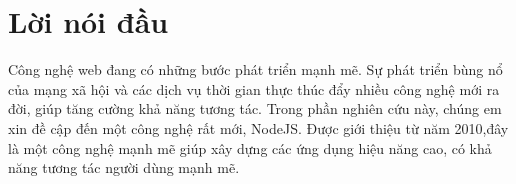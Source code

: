 ﻿\chapter*{Lời nói đầu}
   Công nghệ web đang có những bước phát triển mạnh mẽ. Sự phát triển bùng nổ của mạng xã hội và các dịch vụ thời gian thực thúc đẩy nhiều công nghệ mới ra đời, giúp tăng cường khả năng tương tác. Trong phần nghiên cứu này, chúng em xin đề cập đến một công nghệ rất mới, NodeJS. Được giới thiệu từ năm 2010,đây là một công nghệ mạnh mẽ giúp xây dựng các ứng dụng hiệu năng cao, có khả năng tương tác người dùng mạnh mẽ.
